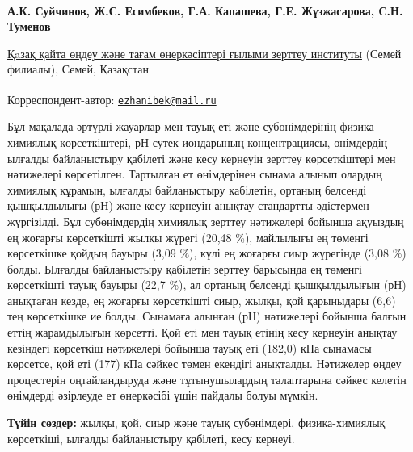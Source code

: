 
\begin{articleheader}

{\bfseries
А.К. Суйчинов,
Ж.С. Есимбеков\textsuperscript{\envelope },
Г.А. Капашева,
Г.Е. Жүзжасарова,
С.Н. Туменов
}
\end{articleheader}

\begin{affiliation}
\href{https://rpf.kz/?lang=kk}{Қaзақ қайта өңдеу және тағам өнеркәсіптері ғылыми зерттеу институты} (Семей филиалы), Семей, Қазақстан

\raggedright \textsuperscript{\envelope }Корреспондент-автор: \href{mailto:ezhanibek@mail.ru}{\nolinkurl{ezhanibek@mail.ru}}
\end{affiliation}

Бұл мақалада әртүрлі жауарлар мен тауық еті және субөнімдерінің
физика-химиялық көрсеткіштері, рН сутек иондарының концентрациясы,
өнімдердің ылғалды байланыстыру қабілеті және кесу кернеуін зерттеу
көрсеткіштері мен нәтижелері көрсетілген. Тартылған ет өнімдерінен
сынама алынып олардың химиялық құрамын, ылғалды байланыстыру қабілетін,
ортаның белсенді қышқылдылығы (рН) және кесу кернеуін анықтау стандартты
әдістермен жүргізілді. Бұл субөнімдердің химиялық зерттеу нәтижелері
бойынша ақуыздың ең жоғарғы көрсеткішті жылқы жүрегі (20,48 \%),
майлылығы ең төменгі көрсеткішке қойдың бауыры (3,09 \%), күлі ең
жоғарғы сиыр жүрегінде (3,08 \%) болды. Ылғалды байланыстыру қабілетін
зерттеу барысында ең төменгі көрсеткішті тауық бауыры (22,7 \%), ал
ортаның белсенді қышқылдылығын (рН) анықтаған кезде, ең жоғарғы
көрсеткішті сиыр, жылқы, қой қарыныдары (6,6) тең көрсеткішке ие болды.
Сынамаға алынған (рН) нәтижелері бойынша балғын еттің жарамдылығын
көрсетті. Қой еті мен тауық етінің кесу кернеуін анықтау кезіндегі
көрсеткіш нәтижелері бойынша тауық еті (182,0) кПа сынамасы көрсетсе,
қой еті (177) кПа сәйкес төмен екендігі анықталды. Нәтижелер өңдеу
процестерін оңтайландыруда және тұтынушылардың талаптарына сәйкес
келетін өнімдерді әзірлеуде ет өнеркәсібі үшін пайдалы болуы мүмкін.

{\bfseries Түйін сөздер:} жылқы, қой, сиыр және тауық субөнімдері,
физика-химиялық көрсеткіші, ылғалды байланыстыру қабілеті, кесу кернеуі.

